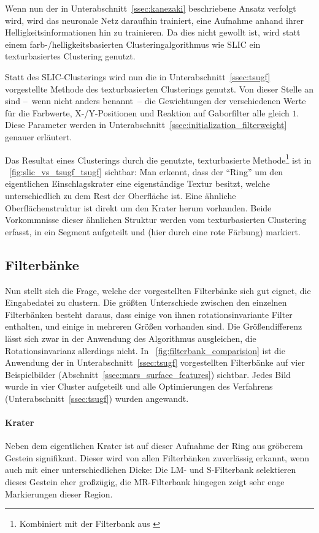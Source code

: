 Wenn nun der in Unterabschnitt~\ref{ssec:kanezaki} beschriebene Ansatz verfolgt wird, wird das neuronale Netz daraufhin trainiert, eine Aufnahme anhand ihrer Helligkeitsinformationen hin zu trainieren. Da dies nicht gewollt ist, wird statt einem farb-/helligkeitsbasierten Clusteringalgorithmus wie SLIC ein texturbasiertes Clustering genutzt.

Statt des SLIC-Clusterings wird nun die in Unterabschnitt~\ref{ssec:tsugf} vorgestellte Methode des texturbasierten Clusterings genutzt. Von dieser Stelle an sind --~wenn nicht anders benannt~-- die Gewichtungen der verschiedenen Werte für die Farbwerte, X-/Y-Positionen und Reaktion auf Gaborfilter alle gleich $1$. Diese Parameter werden in Unterabschnitt~\ref{ssec:initialization_filterweight} genauer erläutert.

Das Resultat eines Clusterings durch die genutzte, texturbasierte Methode\footnote{Kombiniert mit der Filterbank aus \cite{jain_91}} ist in \figurename~\ref{fig:slic_vs_tsugf_tsugf} sichtbar: Man erkennt, dass der \enquote{Ring} um den eigentlichen Einschlagskrater eine eigenständige Textur besitzt, welche unterschiedlich zu dem Rest der Oberfläche ist. Eine ähnliche Oberflächenstruktur ist direkt um den Krater herum vorhanden. Beide Vorkommnisse dieser ähnlichen Struktur werden vom texturbasierten Clustering erfasst, in ein Segment aufgeteilt und (hier durch eine rote Färbung) markiert.

\subsection{Filterbänke}
\label{ssec:initialization_filterbanks}
Nun stellt sich die Frage, welche der vorgestellten Filterbänke sich gut eignet, die Eingabedatei zu clustern. Die größten Unterschiede zwischen den einzelnen Filterbänken besteht daraus, dass einige von ihnen rotationsinvariante Filter enthalten, und einige in mehreren Größen vorhanden sind. Die Größendifferenz lässt sich zwar in der Anwendung des Algorithmus ausgleichen, die Rotationsinvarianz allerdings nicht. In \figurename~\ref{fig:filterbank_comparision} ist die Anwendung der in Unterabschnitt~\ref{ssec:tsugf} vorgestellten Filterbänke auf vier Beispielbilder (\vgl Abschnitt~\ref{ssec:mars_surface_features}) sichtbar. Jedes Bild wurde in vier Cluster aufgeteilt und alle Optimierungen des Verfahrens (\vgl Unterabschnitt~\ref{ssec:tsugf}) wurden angewandt.

\paragraph{Krater}
Neben dem eigentlichen Krater ist auf dieser Aufnahme der Ring aus gröberem Gestein signifikant. Dieser wird von allen Filterbänken zuverlässig erkannt, wenn auch mit einer unterschiedlichen Dicke: Die LM- und S-Filterbank selektieren dieses Gestein eher großzügig, die MR-Filterbank hingegen zeigt sehr enge Markierungen dieser Region.

